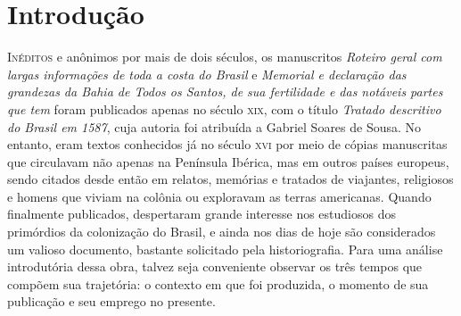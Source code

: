 \chapter[Introdução, \emph{por Fernanda Trindade Luciani}]{Introdução}



\textsc{Inéditos} e anônimos por mais de dois
séculos, os manuscritos \textit{\mbox{Roteiro} geral com largas informações de
toda a costa do Brasil} e \textit{Memorial e declaração das grandezas
da Bahia de Todos os Santos, de sua fertilidade e das notáveis partes
que tem} foram publicados apenas no século \textsc{xix}, com o título 
\textit{Tratado descritivo do Brasil em 1587}, cuja autoria foi atribuída a
Gabriel Soares de Sousa. No entanto, eram textos conhecidos já no
século \textsc{xvi} por meio de cópias manuscritas que circulavam não apenas na
Península Ibérica, mas em outros países europeus, sendo citados desde
então em relatos, memórias e tratados de viajantes, religiosos e homens
que viviam na colônia ou exploravam as terras americanas. Quando
finalmente publicados, despertaram grande interesse nos estudiosos dos
primórdios da colonização do Brasil, e ainda nos dias de hoje são
considerados um valioso documento, bastante solicitado pela
historiografia. Para uma análise introdutória dessa obra, talvez seja
conveniente observar os três tempos que compõem sua trajetória: o
contexto em que foi produzida, o momento de sua publicação e seu
emprego no presente.

